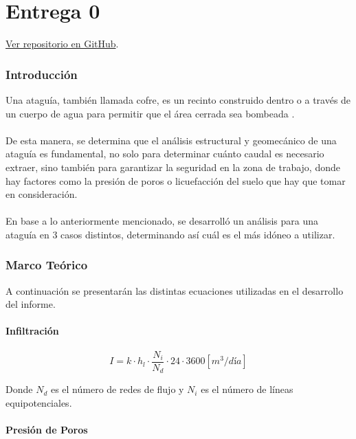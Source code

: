\part{Entrega 0}
\begin{center}
  \href{https://github.com/LukasWolff2002/PROYECTO_1_MCOCo}{Ver repositorio en GitHub}.
\end{center}

\section{Introducción}

Una ataguía, también llamada cofre, es un recinto construido dentro o a través de un cuerpo de agua para permitir que el área cerrada sea bombeada \textbf{\citet{acerlum2023}}.
\\ \\
De esta manera, se determina que el análisis estructural y geomecánico de una ataguía es fundamental, no solo para determinar cuánto caudal es necesario extraer, sino también para garantizar la seguridad en la zona de trabajo, donde hay factores como la presión de poros o licuefacción del suelo que hay que tomar en consideración.
\\ \\
En base a lo anteriormente mencionado, se desarrolló un análisis para una ataguía en 3 casos distintos, determinando así cuál es el más idóneo a utilizar.

\section{Marco Teórico}

A continuación se presentarán las distintas ecuaciones utilizadas en el desarrollo del informe.

\subsection{Infiltración}

\begin{equation}
  I = k \cdot h_l \cdot \frac{N_i}{N_d} \cdot 24 \cdot 3600 [m^3/día]
\end{equation}

Donde $N_d$ es el número de redes de flujo y $N_i$ es el número de líneas equipotenciales.

\subsection{Presión de Poros}


